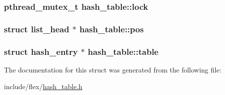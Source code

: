 \subsubsection[{\texorpdfstring{lock}{lock}}]{\setlength{\rightskip}{0pt plus 5cm}pthread\+\_\+mutex\+\_\+t hash\+\_\+table\+::lock}\hypertarget{structhash__table_af4cefababf047c699eca5f45f8d4284e}{}\label{structhash__table_af4cefababf047c699eca5f45f8d4284e}
\subsubsection[{\texorpdfstring{pos}{pos}}]{\setlength{\rightskip}{0pt plus 5cm}struct {\bf list\+\_\+head} $\ast$ hash\+\_\+table\+::pos}\hypertarget{structhash__table_af9bcc20e562a8a4f6dd37aaa543a3883}{}\label{structhash__table_af9bcc20e562a8a4f6dd37aaa543a3883}
\subsubsection[{\texorpdfstring{table}{table}}]{\setlength{\rightskip}{0pt plus 5cm}struct {\bf hash\+\_\+entry} $\ast$ hash\+\_\+table\+::table}\hypertarget{structhash__table_a04cd18d2fc0ace3527670ceca050492b}{}\label{structhash__table_a04cd18d2fc0ace3527670ceca050492b}


The documentation for this struct was generated from the following file\+:\begin{DoxyCompactItemize}
\item 
include/flex/\hyperlink{include_2flex_2hash__table_8h}{hash\+\_\+table.\+h}\end{DoxyCompactItemize}
